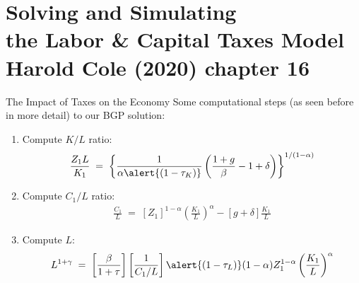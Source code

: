 \documentclass[10pt,c,aspectratio=1610,handout]{beamer}
\begin{document}
\section{Solving and Simulating\\the Labor \& Capital Taxes Model\\{\small Harold Cole (2020) chapter 16}}%
\begin{frame}{The Impact of Taxes on the Economy}
  Some computational steps (as seen before in more detail) to our BGP solution:%
  \begin{enumerate}%
    \item Compute $K/L$ ratio:%
    \begin{align}%
      \frac{Z_{1} L}{K_{1}} \; = \; \left\{ \frac{1}{\alpha \alert{(1-\tau_K)}} \left( \frac{1+g}{\beta} - 1 + \delta \right) \right\}^{1/(1-\alpha)}\label{PrLtoKratio2}%
    \end{align}%
    \pause%
    \item Compute $C_1/L$ ratio:%
    \begin{align}%
      \frac{C_1}{L} \; = \; \left[ Z_{1} \right]^{1-\alpha} \left( \frac{K_{1}}{L} \right)^{\alpha} - \left[ g+\delta \right] \frac{K_{1}}{L}%
    \end{align}%
    \pause%
    \item Compute $L$:%
    \begin{align}%
      L^{1+\gamma} \; = \; \left[ \frac{\beta}{1+\tau} \right] \left[ \frac{1}{C_1/L} \right] \alert{(1-\tau_L)} (1-\alpha) Z_{1}^{1-\alpha} \left( \frac{K_{1}}{L} \right)^{\alpha}\label{BGFLabor2}%
    \end{align}%
    \pause%
  \end{enumerate}%
\end{frame}%
\end{document}
